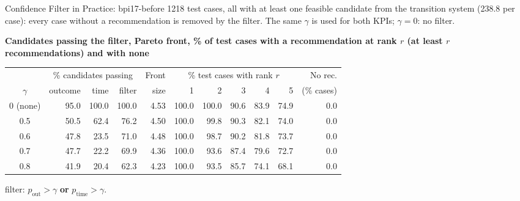 \documentclass[aspectratio=169]{beamer} %
\begin{document}
\begin{frame}{Confidence Filter in Practice: bpi17-before}
  \small
  1218 test cases, \alert{all} with at least one feasible candidate from the transition system
  (238.8 per case): every case without a recommendation is removed by the filter. The same $\gamma$ is used for
  both KPIs; $\gamma = 0$: no filter.

  \textbf{Candidates passing the filter, Pareto front, \% of test cases with a recommendation at rank $r$ (at least $r$ recommendations) and with none}
  \begin{center}\setlength{\tabcolsep}{4pt}\setlength{\aboverulesep}{0pt}\setlength{\belowrulesep}{1pt}
  \begin{tabular}{crrrrrrrrrr}
    \toprule
     & \multicolumn{3}{c}{\% candidates passing} & Front & \multicolumn{5}{c}{\% test cases with rank $r$} & No rec. \\
    \cmidrule(lr){2-4}\cmidrule(lr){6-10}
    $\gamma$ & outcome & time & filter & size & 1 & 2 & 3 & 4 & 5 & (\% cases) \\
    \midrule
    0 (none) & 95.0  & 100.0 & 100.0 & 4.53 & 100.0 & 100.0 & 90.6 & 83.9 & 74.9 & 0.0 \\
    0.5      & 50.5  & 62.4  & 76.2  & 4.50 & 100.0 & 99.8  & 90.3 & 82.1 & 74.0 & 0.0 \\
    0.6      & 47.8  & 23.5  & 71.0  & 4.48 & 100.0 & 98.7  & 90.2 & 81.8 & 73.7 & 0.0 \\
    0.7      & 47.7  & 22.2  & 69.9  & 4.36 & 100.0 & 93.6  & 87.4 & 79.6 & 72.7 & 0.0 \\
    0.8      & 41.9  & 20.4  & 62.3  & 4.23 & 100.0 & 93.5  & 85.7 & 74.1 & 68.1 & 0.0 \\
    \bottomrule
  \end{tabular}
  \end{center}
  {\scriptsize filter: $p_{\text{out}} > \gamma$ \textbf{or} $p_{\text{time}} > \gamma$.}
\end{frame}
\end{document}
